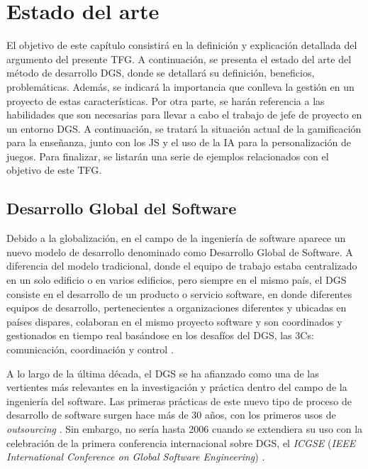 \chapter{Estado del arte}
\label{cap:Antecedentes}

El objetivo de este capítulo consistirá en la definición y explicación detallada del argumento del presente TFG. A continuación, se presenta el estado del arte del método de desarrollo DGS, donde se detallará su definición, beneficios, problemáticas. Además, se indicará la importancia que conlleva la gestión en un proyecto de estas características. Por otra parte, se harán referencia a las habilidades que son necesarias para llevar a cabo el trabajo de jefe de proyecto en un entorno DGS. A continuación, se tratará la situación actual de la gamificación para la enseñanza, junto con los JS y el uso de la IA para la personalización de juegos. Para finalizar, se listarán una serie de ejemplos relacionados con el objetivo de este TFG.

\section{Desarrollo Global del Software}
\label{sec:DGS}

Debido a la globalización, en el campo de la ingeniería de software aparece un nuevo modelo de desarrollo denominado como Desarrollo Global de Software. A diferencia del modelo tradicional, donde el equipo de trabajo estaba centralizado en un solo edificio o en varios edificios, pero siempre en el mismo país, el DGS consiste en el desarrollo de un producto o servicio software, en donde diferentes equipos de desarrollo, pertenecientes a organizaciones diferentes y ubicadas en países dispares, colaboran en el mismo proyecto software y son coordinados y gestionados en tiempo real basándose en los desafíos del DGS, las 3Cs: comunicación, coordinación y control \cite{piattini2014desarrollo}.

A lo largo de la última década, el DGS se ha afianzado como una de las vertientes más relevantes en la investigación y práctica dentro del campo de la ingeniería del software. Las primeras prácticas de este nuevo tipo de proceso de desarrollo de software surgen hace más de 30 años, con los primeros usos de \emph{outsourcing} \cite{boehm2006view}. Sin embargo, no sería hasta 2006 cuando se extendiera su uso con la celebración de la primera conferencia internacional sobre DGS, el \emph{ICGSE} (\emph{IEEE International Conference on Global Software Engineering}) \cite{piattini2014desarrollo, vizcaino2015vision}.

